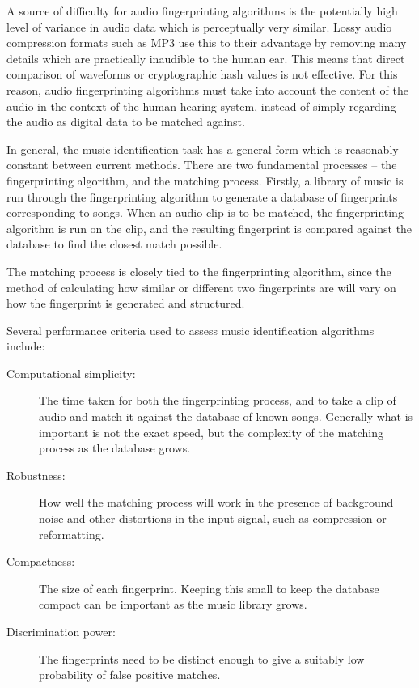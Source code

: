 \documentclass[12pt]{article}
\begin{document}
A source of difficulty for audio fingerprinting algorithms is the potentially high level of variance in audio data which is perceptually very similar. Lossy audio compression formats such as MP3 use this to their advantage by removing many details which are practically inaudible to the human ear. This means that direct comparison of waveforms or cryptographic hash values is not effective. For this reason, audio fingerprinting algorithms must take into account the content of the audio in the context of the human hearing system, instead of simply regarding the audio as digital data to be matched against.

In general, the music identification task has a general form which is reasonably constant between current methods. There are two fundamental processes -- the fingerprinting algorithm, and the matching process. Firstly, a library of music is run through the fingerprinting algorithm to generate a database of fingerprints corresponding to songs. When an audio clip is to be matched, the fingerprinting algorithm is run on the clip, and the resulting fingerprint is compared against the database to find the closest match possible.

The matching process is closely tied to the fingerprinting algorithm, since the method of calculating how similar or different two fingerprints are will vary on how the fingerprint is generated and structured.

Several performance criteria used to assess music identification algorithms include:

\begin{description}

\item [Computational simplicity:] The time taken for both the fingerprinting process, and to take a clip of audio and match it against the database of known songs. Generally what is important is not the exact speed, but the complexity of the matching process as the database grows.

\item [Robustness:] How well the matching process will work in the presence of background noise and other distortions in the input signal, such as compression or reformatting.

\item [Compactness:] The size of each fingerprint. Keeping this small to keep the database compact can be important as the music library grows.

\item [Discrimination power:] The fingerprints need to be distinct enough to give a suitably low probability of false positive matches.

\end{description}
\end{document}
